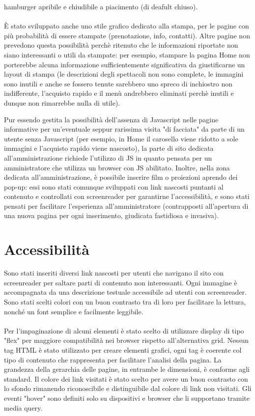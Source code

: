 \documentclass[a4paper, 12pt]{article}
\begin{document}
hamburger apribile e chiudibile a piacimento (di deafult chiuso).\\\\
È stato sviluppato anche uno stile grafico dedicato alla stampa, per le pagine con più probabilità di essere stampate (prenotazione, info, contatti).
Altre pagine non prevedono questa possibilità perchè ritenuto che le informazioni riportate non siano interessanti o utili da stampate: per esempio, stampare la pagina Home non porterebbe alcuna informazione sufficientemente significativa da giustificarne un layout di stampa (le descrizioni degli spettacoli non sono complete, le immagini sono inutili e anche se fossero tenute sarebbero uno spreco di inchiostro
non indifferente, l'acquisto rapido e il menù andrebbero eliminati perchè inutili e dunque non rimarrebbe nulla di utile).

\newpage
Pur essendo gestita la possibilità dell'assenza di Javascript nelle pagine informative per un'eventuale seppur rarissima visita "di facciata" da parte di un utente senza Javascript (per esempio, in Home il carosello viene ridotto a sole immagini e l'acquisto rapido viene nascosto), la parte di sito dedicata all'amministrazione richiede l'utilizzo di JS in quanto pensata per un amministratore che utilizza un browser con JS abilitato. Inoltre, nella zona dedicata all'amministrazione, è possibile inserire film o proiezioni aprendo dei pop-up: essi sono stati comunque sviluppati con link nascosti puntanti al contenuto e controllati con screenreader per garantirne l'accessibilità, e sono stati pensati per facilitare l'esperienza all'amministratore (contrapposti all'apertura di una nuova pagina per ogni inserimento, giudicata fastidiosa e invasiva).

\section{Accessibilità}
Sono stati inseriti diversi link nascosti per utenti che navigano il sito con screenreader per saltare parti di contenuto non interessanti.
Ogni immagine è accompagnata da una descrizione testuale accessibile ad utenti con screenreader.
Sono stati scelti colori con un buon contrasto tra di loro per facilitare la lettura, nonché un font semplice e facilmente leggibile.\\\\
Per l'impaginazione di alcuni elementi è stato scelto di utilizzare display di tipo "flex" per maggiore compatibilità nei browser rispetto all'alternativa grid.
Nessun tag HTML è stato utilizzato per creare elementi grafici, ogni tag è coerente col tipo di contenuto che rappresenta per facilitare l'analisi della pagina.
La grandezza della gerarchia delle pagine, in entrambe le dimensioni, è conforme agli standard.
Il colore dei link visitati è stato scelto per avere un buon contrasto con lo sfondo rimanendo riconoscibile e distinguibile dal colore di link non visitati.
Gli eventi "hover" sono definiti solo su dispositivi e browser che li supportano tramite media query.
\newpage
\end{document}
